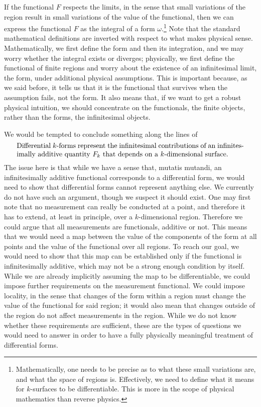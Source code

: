 If the functional $F$ respects the limits, in the sense that small variations of the region result in small variations of the value of the functional, then we can express the functional $F$ as the integral of a form $\omega$.\footnote{Mathematically, one needs to be precise as to what these small variations are, and what the space of regions is. Effectively, we need to define what it means for $k$-surfaces to be differentiable. This is more in the scope of physical mathematics than reverse physics.} Note that the standard mathematical definitions are inverted with respect to what makes physical sense. Mathematically, we first define the form and then its integration, and we may worry whether the integral exists or diverges; physically, we first define the functional of finite regions and worry about the existence of an infinitesimal limit, the form, under additional physical assumptions. This is important because, as we said before, it tells us that it is the functional that survives when the assumption fails, not the form. It also means that, if we want to get a robust physical intuition, we should concentrate on the functionals, the finite objects, rather than the forms, the infinitesimal objects.

We would be tempted to conclude something along the lines of
\begin{equation}
	\eqtext{Differential $k$-forms represent the infinitesimal contributions of an infinitesimally additive quantity $F_k$ that depends on a $k$-dimensional surface.}
\end{equation} 
The issue here is that while we have a sense that, mutatis mutandi, an infinitesimally additive functional corresponds to a differential form, we would need to show that differential forms cannot represent anything else. We currently do not have such an argument, though we suspect it should exist. One may first note that no measurement can really be conducted at a point, and therefore it has to extend, at least in principle, over a $k$-dimensional region. Therefore we could argue that all measurements are functionals, additive or not. This means that we would need a map between the value of the components of the form at all points and the value of the functional over all regions. To reach our goal, we would need to show that this map can be established only if the functional is infinitesimally additive, which may not be a strong enough condition by itself. While we are already implicitly assuming the map to be differentiable, we could impose further requirements on the measurement functional. We could impose locality, in the sense that changes of the form within a region must change the value of the functional for said region; it would also mean that changes outside of the region do not affect measurements in the region. While we do not know whether these requirements are sufficient, these are the types of questions we would need to answer in order to have a fully physically meaningful treatment of differential forms.

